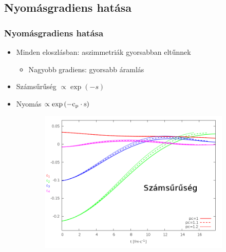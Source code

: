 \documentclass{beamer}
\begin{document}
\begin{frame}
\begin{center}
\begin{figure}[H]
\begin{subfigure}[b]{0.49\textwidth}
	\end{subfigure}
\end{figure}
\end{center}
\end{frame}

\subsection{Nyomásgradiens hatása}
\begin{frame}
\frametitle{Nyomásgradiens hatása}
\begin{center}
\begin{itemize}
\setlength{\itemsep}{12pt}
\item<1-> Minden eloszlásban: aszimmetriák gyorsabban eltűnnek
\begin{itemize}
\vspace{8pt}
\item<1-> Nagyobb gradiens: gyorsabb áramlás
\end{itemize}
\item<1-> Számsűrűség $\propto \exp{(-s)}$
\item<1-> Nyomás $\propto \exp{(-\rm{c_p}\cdot s)}$
\end{itemize}
\begin{figure}[H]
	\centering
    \begin{subfigure}[b]{0.49\textwidth}
    		\includegraphics[width=\textwidth]{pic/res/rel/eps_pc_n}
	\end{subfigure}
	\begin{subfigure}[b]{0.49\textwidth}

\end{subfigure}
\end{figure}
\end{center}
\end{frame}
\end{document}
